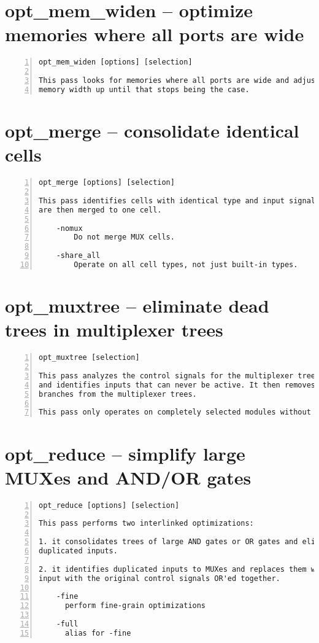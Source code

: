 \section{opt\_mem\_widen -- optimize memories where all ports are wide}
\label{cmd:opt_mem_widen}
\begin{lstlisting}[numbers=left,frame=single]
    opt_mem_widen [options] [selection]

This pass looks for memories where all ports are wide and adjusts the base
memory width up until that stops being the case.
\end{lstlisting}

\section{opt\_merge -- consolidate identical cells}
\label{cmd:opt_merge}
\begin{lstlisting}[numbers=left,frame=single]
    opt_merge [options] [selection]

This pass identifies cells with identical type and input signals. Such cells
are then merged to one cell.

    -nomux
        Do not merge MUX cells.

    -share_all
        Operate on all cell types, not just built-in types.
\end{lstlisting}

\section{opt\_muxtree -- eliminate dead trees in multiplexer trees}
\label{cmd:opt_muxtree}
\begin{lstlisting}[numbers=left,frame=single]
    opt_muxtree [selection]

This pass analyzes the control signals for the multiplexer trees in the design
and identifies inputs that can never be active. It then removes this dead
branches from the multiplexer trees.

This pass only operates on completely selected modules without processes.
\end{lstlisting}

\section{opt\_reduce -- simplify large MUXes and AND/OR gates}
\label{cmd:opt_reduce}
\begin{lstlisting}[numbers=left,frame=single]
    opt_reduce [options] [selection]

This pass performs two interlinked optimizations:

1. it consolidates trees of large AND gates or OR gates and eliminates
duplicated inputs.

2. it identifies duplicated inputs to MUXes and replaces them with a single
input with the original control signals OR'ed together.

    -fine
      perform fine-grain optimizations

    -full
      alias for -fine
\end{lstlisting}

